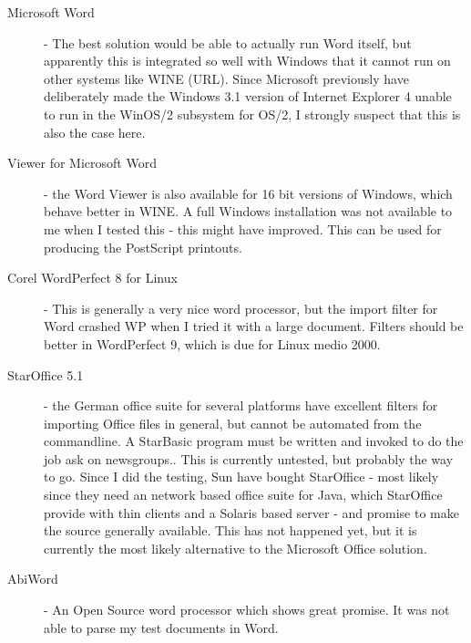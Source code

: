 \begin{description}
\item[Microsoft Word] - The best solution would be able to actually
  run Word itself, but apparently this is integrated so well with
  Windows that it cannot run on other systems like WINE
  (\textsf{URL}).  Since Microsoft previously have deliberately made
  the Windows 3.1 version of Internet Explorer 4 unable to run in the
  WinOS/2 subsystem for OS/2, I strongly suspect that this is also the
  case here.  
\item[Viewer for Microsoft Word] - the Word Viewer is also available
  for 16 bit versions of Windows, which behave better in WINE.
  \textsf{ A full Windows installation was not available to me when I
    tested this - this might have improved}.  This can be used for
  producing the PostScript printouts.
\item[Corel WordPerfect 8 for Linux] - This is generally a very nice
  word processor, but the import filter for Word crashed WP when I
  tried it with a large document.  Filters should be better in
  WordPerfect 9, which is due for Linux medio 2000.
\item[StarOffice 5.1] - the German office suite for several platforms
  have excellent filters for importing Office files in general, but
  cannot be automated from the commandline.  A StarBasic program must
  be written and invoked to do the job \textsf{ask on newsgroups.}.
  This is currently untested, but probably the way to go. Since I did
  the testing, Sun have bought StarOffice - most likely since they
  need an network based office suite for Java, which StarOffice
  provide with thin clients and a Solaris based server - and promise
  to make the source generally available.  This has not happened yet,
  but it is currently the most likely alternative to the Microsoft
  Office solution.
  
\item[AbiWord] - An Open Source word processor which shows great
  promise.  It was not able to parse my test documents in Word.


\end{description}
